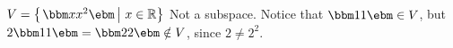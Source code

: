 {$V = \left\{\left. \bbm x\\x^2 \ebm \, \right| \, x\in\mathbb{R}\right\}$}
{Not a subspace. Notice that $\bbm 1\\1\ebm\in V$, but $2\bbm 1\\1\ebm = \bbm 2\\2\ebm\notin V$, since $2\neq 2^2$.}